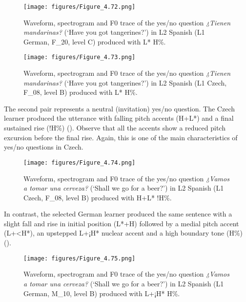 \begin{figure}


\texttt{[image: figures/Figure\_4.72.png]}



\caption{Waveform, spectrogram and F0 trace of the yes/no question \textit{¿Tienen mandarinas?} (‘Have you got tangerines?’) in L2 Spanish (L1 German, F\_20, level C) produced with L* H\%.}
\label{fig:4.72}
\end{figure}

\begin{figure}


\texttt{[image: figures/Figure\_4.73.png]}



\caption{Waveform, spectrogram and F0 trace of the yes/no question \textit{¿Tienen mandarinas?} (‘Have you got tangerines?’) in L2 Spanish (L1 Czech, F\_08, level B) produced with L* H\%.}
\label{fig:4.73}
\end{figure}

The second pair represents a neutral (invitation) yes/no question. The Czech learner produced the utterance with falling pitch accents (H+L*) and a final sustained rise (!H\%) (). Observe that all the accents show a reduced pitch excursion before the final rise. Again, this is one of the main characteristics of yes/no questions in Czech.

\begin{figure}


\texttt{[image: figures/Figure\_4.74.png]}



\caption{Waveform, spectrogram and F0 trace of the yes/no question \textit{¿Vamos a tomar una cerveza?} (‘Shall we go for a beer?’) in L2 Spanish (L1 Czech, F\_08, level B) produced with H+L* !H\%.}
\label{fig:4.74}
\end{figure}

In contrast, the selected German learner produced the same sentence with a slight fall and rise in initial position (L*+H) followed by a medial pitch accent (L+<H*), an upstepped L+¡H* nuclear accent and a high boundary tone (H\%) ().

\begin{figure}


\texttt{[image: figures/Figure\_4.75.png]}



\caption{Waveform, spectrogram and F0 trace of the yes/no question \textit{¿Vamos a tomar una cerveza?} (‘Shall we go for a beer?’) in L2 Spanish (L1 German, M\_10, level B) produced with L+¡H* H\%.}
\label{fig:4.75}
\end{figure}

